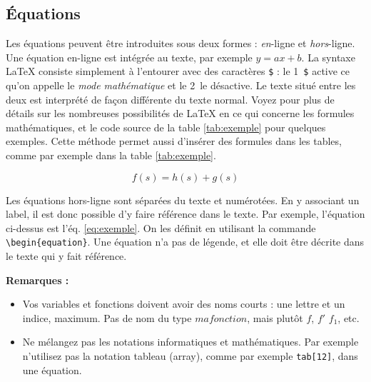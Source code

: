 \documentclass{ceri}
\begin{document}
\subsection{Équations}
\label{sec:equations}
Les équations peuvent être introduites sous deux formes : \textit{en}-ligne et \textit{hors}-ligne. Une équation en-ligne est intégrée au texte, par exemple $y=ax+b$. La syntaxe \LaTeX{} consiste simplement à l'entourer avec des caractères \texttt{\$} : le 1\ier~\texttt{\$} active ce qu'on appelle le \textit{mode mathématique} et le 2\ieme~le désactive. Le texte situé entre les deux est interprété de façon différente du texte normal. Voyez \cite{Wikibooks2010, Wikibooks2011} pour plus de détails sur les nombreuses possibilités de \LaTeX{} en ce qui concerne les formules mathématiques, et le code source de la table \ref{tab:exemple} pour quelques exemples. Cette méthode permet aussi d'insérer des formules dans les tables, comme par exemple dans la table \ref{tab:exemple}.

\begin{equation}
	f(s)=h(s)+g(s)
	\label{eq:exemple}
\end{equation}

Les équations hors-ligne sont séparées du texte et numérotées. En y associant un label, il est donc possible d'y faire référence dans le texte. Par exemple, l'équation ci-dessus est l'éq. \ref{eq:exemple}. On les définit en utilisant la commande \texttt{\textbackslash{}begin\{equation\}}. Une équation n'a pas de légende, et elle doit être décrite dans le texte qui y fait référence.

\textbf{Remarques :}
\begin{itemize}
	\item Vos variables et fonctions doivent avoir des noms courts : une lettre et un indice, maximum. Pas de nom du type ${mafonction}$, mais plutôt $f$, $f'$ $f_1$, etc\@.
	\item Ne mélangez pas les notations informatiques et mathématiques. Par exemple n'utilisez pas la notation tableau (array), comme par exemple \texttt{tab[12]}, dans une équation.
\end{itemize}
	
\end{document}
